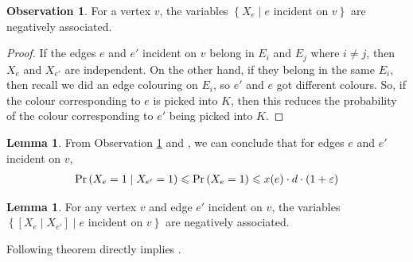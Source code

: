 \documentclass[a4paper,11pt]{article}
\DeclareMathOperator*{\Prob}{\ensuremath{\textnormal{Pr}}}
\renewcommand{\Pr}{\Prob}
\newcommand{\prob}[1]{\Pr\paren{#1}}
\newcommand{\paren}[1]{\left ( #1 \right )}
\newcommand{\set}[1]{\ensuremath{\left\{ #1 \right\}}}
\newcommand{\eps}{\varepsilon}
\theoremstyle{definition}
\theoremstyle{definition}
\theoremstyle{definition}
\theoremstyle{definition}
\theoremstyle{definition}
\newtheorem{lemma2}[definition2]{Lemma}
\theoremstyle{definition}
\theoremstyle{definition}
\newtheorem{observation2}[definition2]{Observation}
\theoremstyle{definition}
\theoremstyle{definition}
\theoremstyle{definition}
\theoremstyle{definition}
\theoremstyle{definition}
\theoremstyle{definition}
\theoremstyle{definition}
\theoremstyle{definition}
\begin{document}
\begin{observation2}\label{obs:negatcorr}
	For a vertex $v$, the variables $\set{X_e\mid e\text{ incident on }v}$ are negatively associated. 
\end{observation2}
\begin{proof}
	If the edges $e$ and $e'$ incident on $v$ belong in $E_i$ and $E_j$ where $i\neq j$, then $X_e$ and $X_{e'}$ are independent. On the other hand, if they belong in the same $E_i$, then recall we did an edge colouring on $E_i$, so $e'$ and $e$ got different colours. So, if the colour corresponding to $e$ is picked into $K$, then this reduces the probability of the colour corresponding to $e'$ being picked into $K$.
\end{proof}

\begin{lemma2}\label{cor:cond}
	From Observation \ref{obs:negatcorr} and , we can conclude that for edges $e$ and $e'$ incident on $v$, 
	\begin{align*}
	\prob{X_e=1\mid X_{e'}=1}\leqslant \prob{X_e=1}\leqslant x(e)\cdot d\cdot (1+\eps)
	\end{align*}
\end{lemma2}

\begin{lemma2}
	For any vertex $v$ and edge $e'$ incident on $v$, the variables $\set{[X_e\mid X_{e'}]\mid e\text{ incident on }v}$ are negatively associated.
\end{lemma2}

Following theorem directly implies . 
\end{document}
